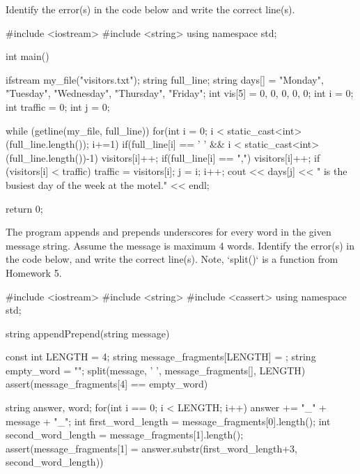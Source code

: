 {{{{{{{{{\begin{multipart}
Identify the error(s) in the code below and write the correct line(s).
\end{multipart}

{%
    #include <iostream>
    #include <string>
    using namespace std;
    
    int main()
    {
        ifstream my_file("visitors.txt"); 
        string full_line;
        string days[] = {"Monday", "Tuesday", "Wednesday", "Thursday", "Friday"};
        int vis[5] = {0, 0, 0, 0, 0}; 
        int i = 0;
        int traffic = 0;
        int j = 0;
    
        while (getline(my_file, full_line))
        {
            for(int i = 0; i < static_cast<int>(full_line.length()); i+=1) 
            {
                if(full_line[i] == ' ' && i < static_cast<int>(full_line.length())-1)
                {
                    visitors[i]++;
                }
                if(full_line[i] == ",") 
                {
                    visitors[i]++;
                }
            }
            if (visitors[i] < traffic) 
            {
                traffic = visitors[i];
                j = i;
            }
            i++;
        }
        cout << days[j] << " is the busiest day of the week at the motel." << endl;
    
        return 0;
    }
{%

\newpage

\begin{multipart}
 The program appends and prepends underscores for every word in the given message string. Assume the message is maximum 4 words. Identify the error(s) in the code below, and write the correct line(s). Note, `split()` is a function from Homework 5.
\end{multipart}

{%
    #include <iostream>
    #include <string>
    #include <cassert>
    using namespace std;
    
    string appendPrepend(string message)
    {
        const int LENGTH = 4;
        string message_fragments[LENGTH] = {};
        string empty_word = "";
        split(message, ' ', message_fragments[], LENGTH) 
        assert(message_fragments[4] == empty_word) 
    
        string answer, word; 
        for(int i == 0; i < LENGTH; i++)
        {
            answer += "_" + message + "_";
        }
        int first_word_length = message_fragments[0].length();
        int second_word_length = message_fragments[1].length();
        assert(message_fragments[1] = answer.substr(first_word_length+3, second_word_length))
    
}}}}}}}}}}}}}
